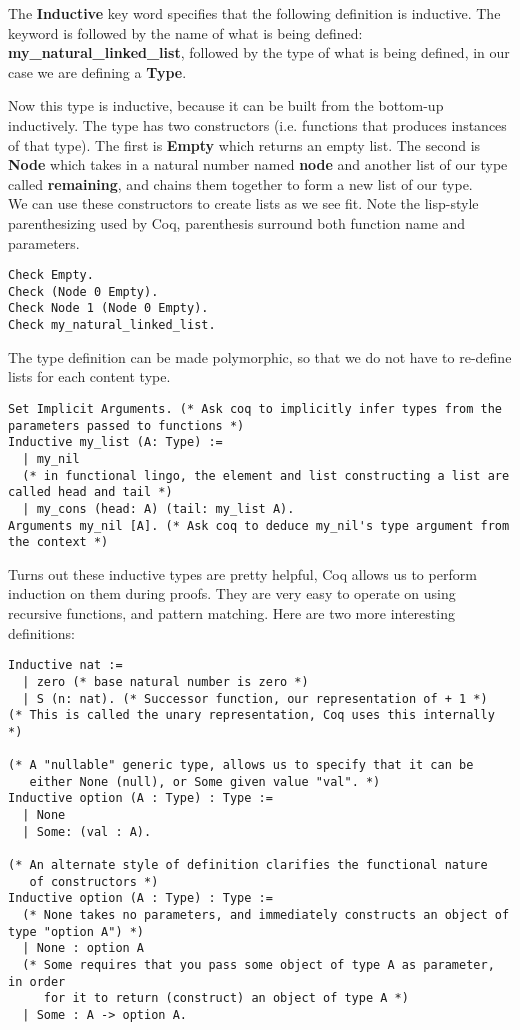 \documentclass{article}
\begin{document}
The \textbf{Inductive} key word specifies that the following definition is inductive. The keyword is followed by the name of what is being defined: \textbf{my\_natural\_linked\_list}, followed by the type of what is being defined, in our case we are defining a \textbf{Type}.

Now this type is inductive, because it can be built from the bottom-up inductively. The type has two constructors (i.e. functions that produces instances of that type). The first is \textbf{Empty} which returns an empty list. The second is \textbf{Node} which takes in a natural number named \textbf{node} and another list of our type called \textbf{remaining}, and chains them together to form a new list of our type. \\

We can use these constructors to create lists as we see fit. Note the lisp-style parenthesizing used by Coq, parenthesis surround both function name and parameters.
\begin{verbatim}
Check Empty.
Check (Node 0 Empty).
Check Node 1 (Node 0 Empty).
Check my_natural_linked_list.
\end{verbatim}

The type definition can be made polymorphic, so that we do not have to re-define lists for each content type.
\begin{verbatim}
Set Implicit Arguments. (* Ask coq to implicitly infer types from the parameters passed to functions *)
Inductive my_list (A: Type) :=
  | my_nil
  (* in functional lingo, the element and list constructing a list are called head and tail *)
  | my_cons (head: A) (tail: my_list A).
Arguments my_nil [A]. (* Ask coq to deduce my_nil's type argument from the context *)
\end{verbatim}

Turns out these inductive types are pretty helpful, Coq allows us to perform induction on them during proofs. They are very easy to operate on
using recursive functions, and pattern matching. Here are two more interesting definitions:
\begin{verbatim}
Inductive nat :=
  | zero (* base natural number is zero *)
  | S (n: nat). (* Successor function, our representation of + 1 *)
(* This is called the unary representation, Coq uses this internally *)

(* A "nullable" generic type, allows us to specify that it can be
   either None (null), or Some given value "val". *)
Inductive option (A : Type) : Type :=
  | None 
  | Some: (val : A).
  
(* An alternate style of definition clarifies the functional nature
   of constructors *)
Inductive option (A : Type) : Type :=
  (* None takes no parameters, and immediately constructs an object of type "option A") *)
  | None : option A
  (* Some requires that you pass some object of type A as parameter, in order
     for it to return (construct) an object of type A *)
  | Some : A -> option A.
\end{verbatim}
\end{document}
